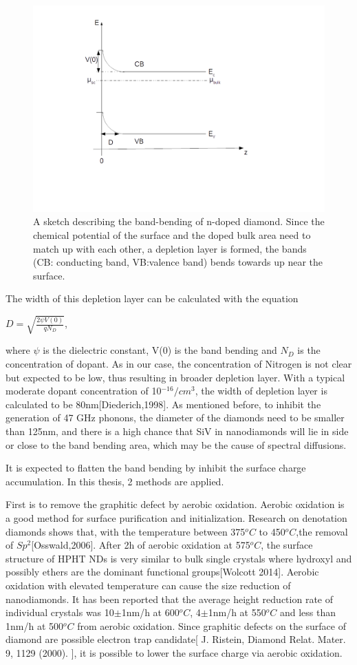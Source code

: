 \begin{figure}[h]
\centering
\includegraphics[width=0.7\linewidth]{Figures/pic/bandbending}
\caption{A sketch describing the band-bending of n-doped diamond. Since the chemical potential of the surface and the doped bulk area need to match up with each other, a depletion layer is formed, the bands (CB: conducting band, VB:valence band) bends towards up near the surface.  }
\label{fig:bandbending}
\end{figure}

The width of this depletion layer can be calculated with the equation

$D = \sqrt{\frac{2\psi V(0)}{qN_{D}}}$, 

where $\psi$ is the dielectric constant, V(0) is the band bending and $N_{D}$ is the concentration of dopant. As in our case, the concentration of Nitrogen is not clear but expected to be low, thus resulting in broader depletion layer. With a typical moderate dopant concentration of 10$^{-16}/cm^{3}$, the width of depletion layer is calculated to be 80nm[Diederich,1998]. As mentioned before, to inhibit the generation of 47 GHz phonons, the diameter of the diamonds need to be smaller than 125nm, and there is a high chance that SiV in nanodiamonds will lie in side or close to the band bending area, which may be the cause of spectral diffusions.

It is expected to flatten the band bending by inhibit the surface charge accumulation. In this thesis, 2 methods are applied. 

First is to remove the graphitic defect by aerobic oxidation. Aerobic oxidation is a good method for surface purification and initialization. Research on denotation diamonds shows that, with the temperature between 375$^{o}C$ to 450$^{o}C$,the removal of $Sp^{2}$[Osswald,2006]. After 2h of aerobic oxidation at 575$^{o}C$, the surface structure of HPHT NDs is very similar to bulk single crystals where hydroxyl and possibly ethers are the dominant functional groups[Wolcott 2014]. Aerobic oxidation with elevated temperature can cause the size reduction of nanodiamonds. It has been reported that the average height reduction rate of individual crystals was 10$\pm$1nm/h at 600$^{o}C$, 4$\pm$1nm/h at 550$^{o}C$ and less than 1nm/h at 500$^{o}C$ from aerobic oxidation. Since graphitic defects on the surface of diamond are possible electron trap candidate[ J. Ristein, Diamond Relat. Mater. 9, 1129 (2000). ], it is possible to lower the surface charge via aerobic oxidation.

